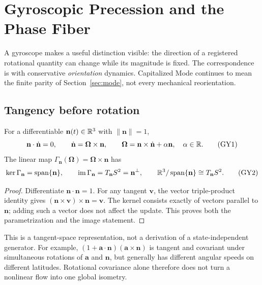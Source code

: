 \begingroup
\renewcommand{\thesection}{37B}
\section{Gyroscopic Precession and the Phase Fiber}\label{sec:gyroscopic}
A gyroscope makes a useful distinction visible: the direction of a registered rotational quantity can change while its magnitude is fixed. The correspondence is with conservative \emph{orientation} dynamics. Capitalized Mode continues to mean the finite parity of Section~\ref{sec:mode}, not every mechanical reorientation.

\subsection{Tangency before rotation}
\begin{proposition}\label{prop:axistangency}
For a differentiable $\mathbf n(t)\in\mathbb R^3$ with $\|\mathbf n\|=1$,
\begin{equation}
\mathbf n\cdot\dot{\mathbf n}=0,\qquad
\dot{\mathbf n}=\boldsymbol\Omega\times\mathbf n,\qquad
\boldsymbol\Omega=\mathbf n\times\dot{\mathbf n}+\alpha\mathbf n,
\quad\alpha\in\mathbb R.
\tag{GY1}\label{eq:axistangency}
\end{equation}
The linear map $\Gamma_{\mathbf n}(\boldsymbol\Omega)=\boldsymbol\Omega\times\mathbf n$ has
\begin{equation}
\ker\Gamma_{\mathbf n}=\operatorname{span}\{\mathbf n\},\qquad
\operatorname{im}\Gamma_{\mathbf n}=T_{\mathbf n}S^2=\mathbf n^\perp,\qquad
\mathbb R^3/\operatorname{span}\{\mathbf n\}\cong T_{\mathbf n}S^2.
\tag{GY2}\label{eq:axiskernel}
\end{equation}
\end{proposition}
\begin{proof}
Differentiate $\mathbf n\cdot\mathbf n=1$. For any tangent $\mathbf v$, the vector triple-product identity gives $(\mathbf n\times\mathbf v)\times\mathbf n=\mathbf v$. The kernel consists exactly of vectors parallel to $\mathbf n$; adding such a vector does not affect the update. This proves both the parametrization and the image statement.
\end{proof}
This is a tangent-space representation, not a derivation of a state-independent generator. For example, $(1+\mathbf a\cdot\mathbf n)(\mathbf a\times\mathbf n)$ is tangent and covariant under simultaneous rotations of $\mathbf a$ and $\mathbf n$, but generally has different angular speeds on different latitudes. Rotational covariance alone therefore does not turn a nonlinear flow into one global isometry.

